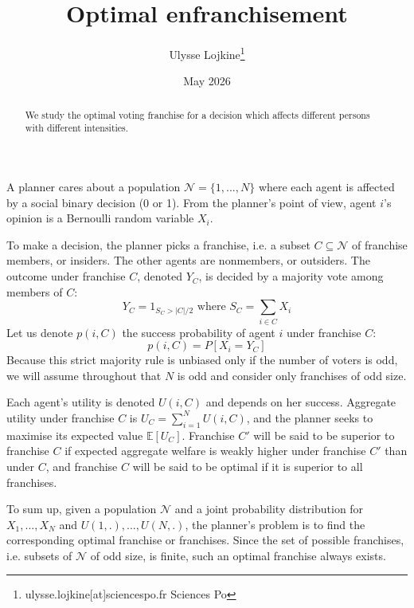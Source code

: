 \documentclass{article}
\title{Optimal enfranchisement}
\author{Ulysse Lojkine\footnote{ulysse.lojkine[at]sciencespo.fr Sciences Po}}
\date{May 2026}
\theoremstyle{definition}
\theoremstyle{theorem}
\begin{document}
\maketitle

\begin{abstract}
 We study the optimal voting franchise for a decision which affects different persons with different intensities.
 \end{abstract}

A planner cares about a population $\mathcal{N} = \{ 1, ..., N \}$ where each agent is affected by a social binary decision (0 or 1). From the planner's point of view, agent $i$'s opinion is a Bernoulli random variable $X_i$.

To make a decision, the planner picks a franchise, i.e. a subset $C \subseteq \mathcal{N}$ of franchise members, or insiders. The other agents are nonmembers, or outsiders. The outcome under franchise $C$, denoted $Y_C$, is decided by a majority vote among members of $C$:
\begin{equation*}
Y_C = 1_{S_C > |C|/2} \text{ where }
S_C = \sum_{i \in C} X_i
\end{equation*}
Let us denote $p(i,C)$ the success probability of agent $i$ under franchise $C$:
\begin{equation*}
    p(i,C) = P[X_i = Y_C]
\end{equation*}
Because this strict majority rule is unbiased only if the number of voters is odd, we will assume throughout that $N$ is odd and consider only franchises of odd size.

Each agent's utility is denoted $U(i,C)$ and depends on her success. Aggregate utility under franchise $C$ is $U_C = \sum_{i=1}^N U(i,C)$, and the planner seeks to maximise its expected value $\mathbb{E}[U_C]$. Franchise $C'$ will be said to be superior to franchise $C$ if expected aggregate welfare is weakly higher under franchise $C'$ than under $C$, and franchise $C$ will be said to be optimal if it is superior to all franchises.

To sum up, given a population $\mathcal{N}$ and a joint probability distribution for $X_1, ..., X_N$ and $U(1,.), ..., U(N,.)$, the planner's problem is to find the corresponding optimal franchise or franchises. Since the set of possible franchises, i.e. subsets of $\mathcal{N}$ of odd size, is finite, such an optimal franchise always exists.
\end{document}
